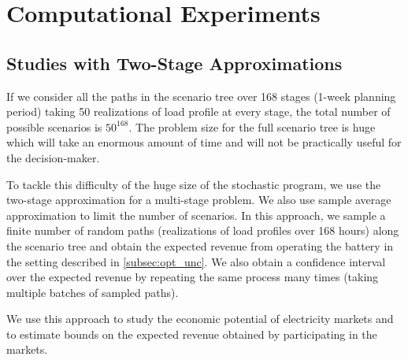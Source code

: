 \documentclass[11pt,twoside]{article}
\begin{document}
\section{Computational Experiments}\label{sec:exp}
\subsection{Studies with Two-Stage Approximations}
If we consider all the paths in the scenario tree over 168 stages (1-week planning period) taking 50 realizations of load profile at every stage, the total number of possible scenarios is $50^{168}$. The problem size for the full scenario tree is huge which will take an enormous amount of time and will not be practically useful for the decision-maker. 

To tackle this difficulty of the huge size of the stochastic program, we use the two-stage approximation for a multi-stage problem. We also use sample average approximation to limit the number of scenarios. In this approach, we sample a finite number of random paths (realizations of load profiles over 168 hours) along the scenario tree and obtain the expected revenue from operating the battery in the setting described in \ref{subsec:opt_unc}. We also obtain a confidence interval over the expected revenue by repeating the same process many times (taking multiple batches of sampled paths).

We use this approach to study the economic potential of electricity markets and to estimate bounds on the expected revenue obtained by participating in the markets.
\end{document}

